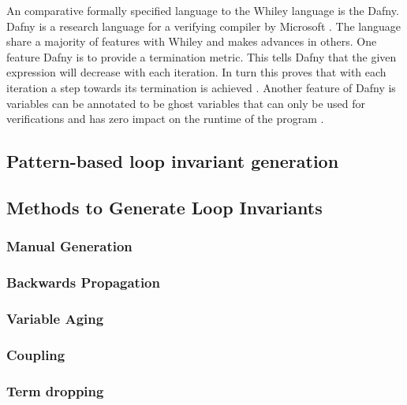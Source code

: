 An comparative formally specified language to the Whiley language is the Dafny.
Dafny is a research language for a verifying compiler by Microsoft
\cite{dafny-lang}.
The language share a majority of features with Whiley and makes advances
in others.
One feature Dafny is to provide a termination metric.
This tells Dafny that the given expression will decrease with each iteration. 
In turn this proves that with each iteration a step towards its termination is achieved \cite{dafny-started}\cite{dafny-lang}.
Another feature of Dafny is variables can be annotated to be ghost variables that
can only be used for verifications and has zero impact on the runtime of the program \cite{dafny-started}\cite{dafny-lang}.

\cite{dafny-started}
\cite{dafny-lang}
\cite{dafny-mech}

\subsection{Pattern-based loop invariant generation}

\cite{pattern-loop-inv}

\subsection{Methods to Generate Loop Invariants}

\subsubsection{Manual Generation}

\cite{broda-loop-tech}

\subsubsection{Backwards Propagation}

\cite{infer-postconditions}
\cite{infer-dynamic}

\subsubsection{Variable Aging}

\cite{infer-postconditions}
\cite{infer-dynamic}

\subsubsection{Coupling}

\cite{infer-postconditions}
\cite{infer-dynamic}

\subsubsection{Term dropping}

\cite{infer-postconditions}
\cite{infer-dynamic}

\cite{struct-induction}